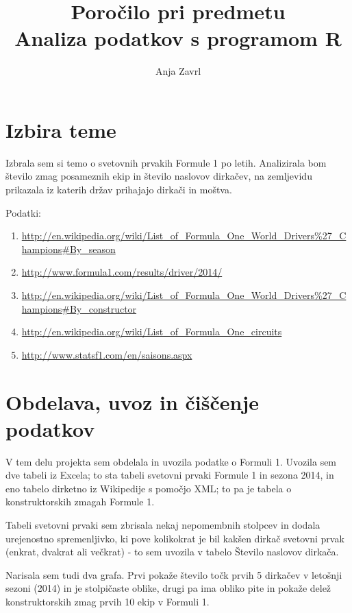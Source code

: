 \documentclass[11pt,a4paper]{article}
\begin{document}
\title{Poročilo pri predmetu \\
Analiza podatkov s programom R}
\author{Anja Zavrl}
\maketitle

\section{Izbira teme}

Izbrala sem si temo o svetovnih prvakih Formule 1 po letih. Analizirala bom število zmag posameznih ekip in število naslovov dirkačev, na zemljevidu prikazala iz katerih držav prihajajo dirkači in moštva.

Podatki: 
\begin{enumerate}
\item \url{http://en.wikipedia.org/wiki/List_of_Formula_One_World_Drivers%27_Champions#By_season}
\item \url{http://www.formula1.com/results/driver/2014/}
\item \url{http://en.wikipedia.org/wiki/List_of_Formula_One_World_Drivers%27_Champions#By_constructor}
\item \url{http://en.wikipedia.org/wiki/List_of_Formula_One_circuits}
\item \url{http://www.statsf1.com/en/saisons.aspx}
\end{enumerate}

\section{Obdelava, uvoz in čiščenje podatkov}

V tem delu projekta sem obdelala in uvozila podatke o Formuli 1. Uvozila sem dve tabeli iz Excela; to sta tabeli
svetovni prvaki Formule 1 in sezona 2014, in eno tabelo dirketno iz Wikipedije s pomočjo XML; to pa je tabela o konstruktorskih zmagah Formule 1. 

Tabeli svetovni prvaki sem zbrisala nekaj nepomembnih stolpcev in dodala urejenostno spremenljivko, ki pove kolikokrat je bil kakšen dirkač svetovni prvak (enkrat, dvakrat ali večkrat) - to sem uvozila v tabelo Število naslovov dirkača.

Narisala sem tudi dva grafa. Prvi pokaže število točk prvih 5 dirkačev v letošnji sezoni (2014) in je stolpičaste oblike, drugi pa ima obliko pite in pokaže delež konstruktorskih zmag prvih 10 ekip v Formuli 1.
\end{document}
